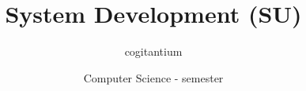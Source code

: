\documentclass[10pt]{report}
\title{System Development (SU)}
\author{cogitantium}
\date{Computer Science - \nth{3} semester}
\begin{document}

\begin{titlepage}
    \thispagestyle{empty}
    \maketitle
\end{titlepage}

\restoregeometry


\tableofcontents












%


\end{document}
